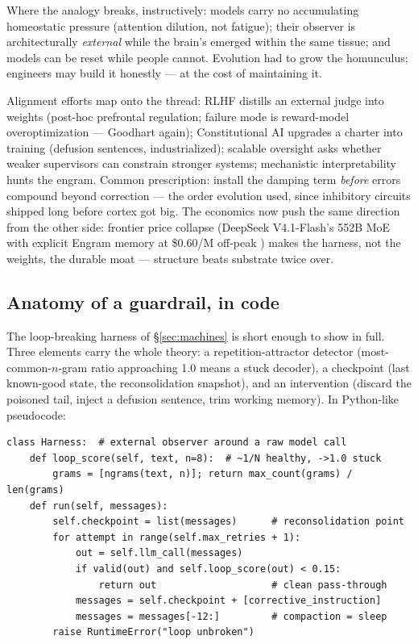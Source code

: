 \documentclass[11pt]{article}
\begin{document}
Where the analogy breaks, instructively: models carry no accumulating homeostatic pressure (attention dilution, not fatigue); their observer is architecturally \emph{external} while the brain's emerged within the same tissue; and models can be reset while people cannot. Evolution had to grow the homunculus; engineers may build it honestly --- at the cost of maintaining it.

Alignment efforts map onto the thread: RLHF distills an external judge into weights (post-hoc prefrontal regulation; failure mode is reward-model overoptimization --- Goodhart again); Constitutional AI upgrades a charter into training (defusion sentences, industrialized); scalable oversight asks whether weaker supervisors can constrain stronger systems; mechanistic interpretability hunts the engram. Common prescription: install the damping term \emph{before} errors compound beyond correction --- the order evolution used, since inhibitory circuits shipped long before cortex got big. The economics now push the same direction from the other side: frontier price collapse (DeepSeek V4.1-Flash's 552B MoE with explicit Engram memory at \$0.60/M off-peak \citep{deepseek2026}) makes the harness, not the weights, the durable moat --- structure beats substrate twice over.

\subsection{Anatomy of a guardrail, in code}

The loop-breaking harness of \S\ref{sec:machines} is short enough to show in full. Three elements carry the whole theory: a repetition-attractor detector (most-common-$n$-gram ratio approaching 1.0 means a stuck decoder), a checkpoint (last known-good state, the reconsolidation snapshot), and an intervention (discard the poisoned tail, inject a defusion sentence, trim working memory). In Python-like pseudocode:

\begin{verbatim}
class Harness:  # external observer around a raw model call
    def loop_score(self, text, n=8):  # ~1/N healthy, ->1.0 stuck
        grams = [ngrams(text, n)]; return max_count(grams) / len(grams)
    def run(self, messages):
        self.checkpoint = list(messages)      # reconsolidation point
        for attempt in range(self.max_retries + 1):
            out = self.llm_call(messages)
            if valid(out) and self.loop_score(out) < 0.15:
                return out                    # clean pass-through
            messages = self.checkpoint + [corrective_instruction]
            messages = messages[-12:]         # compaction = sleep
        raise RuntimeError("loop unbroken")
\end{verbatim}
\end{document}
